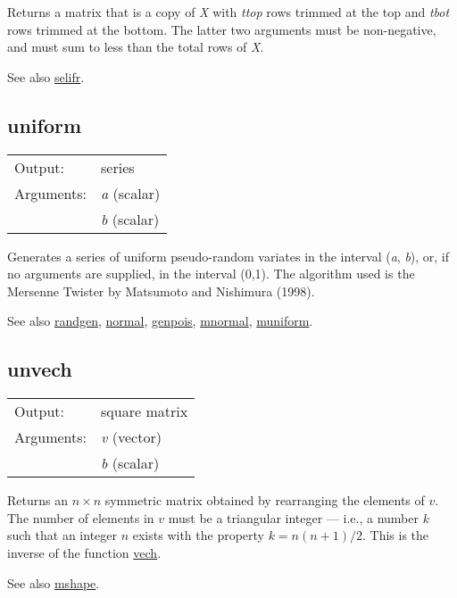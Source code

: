 	  Returns a matrix that is a copy of \textsl{X} with
	  \textsl{ttop} rows trimmed at the top and
	  \textsl{tbot} rows trimmed at the bottom.  The latter two
	  arguments must be non-negative, and must sum to less than the total
	  rows of \textsl{X}.

	  See also \hyperlink{func-selifr}{selifr}.

\subsection{uniform}
\hypertarget{func-uniform}{}

\begin{tabular}{ll}
Output:     & series\\
Arguments:  & \textsl{a} (scalar)\\
           & \textsl{b} (scalar)\\
\end{tabular}

	  Generates a series of uniform pseudo-random variates in the
	  interval (\textsl{a}, \textsl{b}), or, if no
	  arguments are supplied, in the interval (0,1). The algorithm
	  used is the Mersenne Twister by Matsumoto and Nishimura (1998).

	  See also \hyperlink{func-randgen}{randgen}, \hyperlink{func-normal}{normal}, \hyperlink{func-genpois}{genpois}, \hyperlink{func-mnormal}{mnormal}, \hyperlink{func-muniform}{muniform}.

\subsection{unvech}
\hypertarget{func-unvech}{}

\begin{tabular}{ll}
Output:     & square matrix\\
Arguments:  & \textsl{v} (vector)\\
           & \textsl{b} (scalar)\\
\end{tabular}

	  Returns an \ensuremath{n\times n} symmetric matrix obtained by
	  rearranging the elements of \ensuremath{v}. The number of elements
	  in \ensuremath{v} must be a triangular integer --- i.e.{}, a
	  number \ensuremath{k} such that an integer \ensuremath{n} exists
	  with the property $k = n(n+1)/2$. This is the inverse of the function
	  \hyperlink{func-vech}{vech}. 

	  See also \hyperlink{func-mshape}{mshape}.

